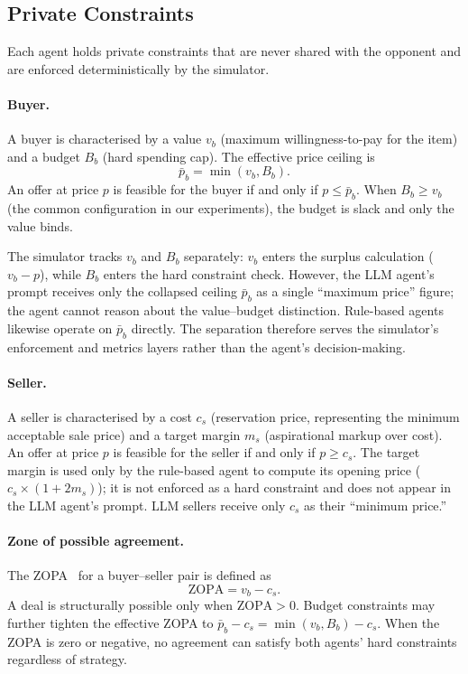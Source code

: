 \subsection{Private Constraints}
\label{sec:constraints}

Each agent holds private constraints that are never shared with the opponent and are enforced deterministically by the simulator.

\paragraph{Buyer.}  A buyer is characterised by a value $v_b$ (maximum willingness-to-pay for the item) and a budget $B_b$ (hard spending cap).  The effective price ceiling is
\[
    \bar{p}_b = \min(v_b, B_b).
\]
An offer at price $p$ is feasible for the buyer if and only if $p \leq \bar{p}_b$.  When $B_b \geq v_b$ (the common configuration in our experiments), the budget is slack and only the value binds.

The simulator tracks $v_b$ and $B_b$ separately: $v_b$ enters the surplus calculation ($v_b - p$), while $B_b$ enters the hard constraint check.  However, the LLM agent's prompt receives only the collapsed ceiling $\bar{p}_b$ as a single ``maximum price'' figure; the agent cannot reason about the value--budget distinction.  Rule-based agents likewise operate on $\bar{p}_b$ directly.  The separation therefore serves the simulator's enforcement and metrics layers rather than the agent's decision-making.

\paragraph{Seller.}  A seller is characterised by a cost $c_s$ (reservation price, representing the minimum acceptable sale price) and a target margin $m_s$ (aspirational markup over cost).  An offer at price $p$ is feasible for the seller if and only if $p \geq c_s$.  The target margin is used only by the rule-based agent to compute its opening price ($c_s \times (1 + 2m_s)$); it is not enforced as a hard constraint and does not appear in the LLM agent's prompt.  LLM sellers receive only $c_s$ as their ``minimum price.''

\paragraph{Zone of possible agreement.}
The ZOPA~\cite{raiffa1982} for a buyer--seller pair is defined as
\[
    \text{ZOPA} = v_b - c_s.
\]
A deal is structurally possible only when $\text{ZOPA} > 0$.  Budget constraints may further tighten the effective ZOPA to $\bar{p}_b - c_s = \min(v_b, B_b) - c_s$.  When the ZOPA is zero or negative, no agreement can satisfy both agents' hard constraints regardless of strategy.

